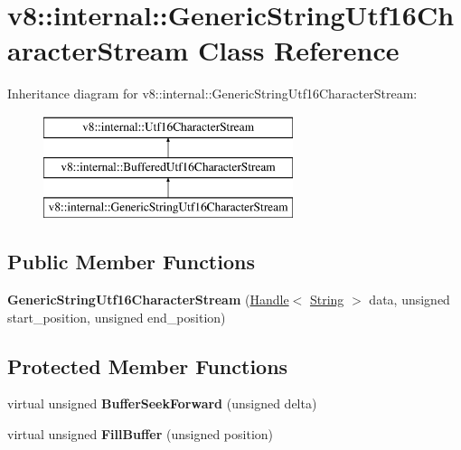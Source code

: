 \hypertarget{classv8_1_1internal_1_1_generic_string_utf16_character_stream}{}\section{v8\+:\+:internal\+:\+:Generic\+String\+Utf16\+Character\+Stream Class Reference}
\label{classv8_1_1internal_1_1_generic_string_utf16_character_stream}
Inheritance diagram for v8\+:\+:internal\+:\+:Generic\+String\+Utf16\+Character\+Stream\+:\begin{figure}[H]
\begin{center}
\leavevmode
\includegraphics[height=3.000000cm]{classv8_1_1internal_1_1_generic_string_utf16_character_stream}
\end{center}
\end{figure}
\subsection*{Public Member Functions}
\begin{DoxyCompactItemize}
\item 
\hypertarget{classv8_1_1internal_1_1_generic_string_utf16_character_stream_aa1998ebc80d66ab386ec8ab0f749776a}{}{\bfseries Generic\+String\+Utf16\+Character\+Stream} (\hyperlink{classv8_1_1internal_1_1_handle}{Handle}$<$ \hyperlink{classv8_1_1internal_1_1_string}{String} $>$ data, unsigned start\+\_\+position, unsigned end\+\_\+position)\label{classv8_1_1internal_1_1_generic_string_utf16_character_stream_aa1998ebc80d66ab386ec8ab0f749776a}

\end{DoxyCompactItemize}
\subsection*{Protected Member Functions}
\begin{DoxyCompactItemize}
\item 
\hypertarget{classv8_1_1internal_1_1_generic_string_utf16_character_stream_a1f883152de47eb479a55a360410fdc95}{}virtual unsigned {\bfseries Buffer\+Seek\+Forward} (unsigned delta)\label{classv8_1_1internal_1_1_generic_string_utf16_character_stream_a1f883152de47eb479a55a360410fdc95}

\item 
\hypertarget{classv8_1_1internal_1_1_generic_string_utf16_character_stream_aaa394fadbc053bb6d787c00d05fb02fa}{}virtual unsigned {\bfseries Fill\+Buffer} (unsigned position)\label{classv8_1_1internal_1_1_generic_string_utf16_character_stream_aaa394fadbc053bb6d787c00d05fb02fa}

\end{DoxyCompactItemize}
